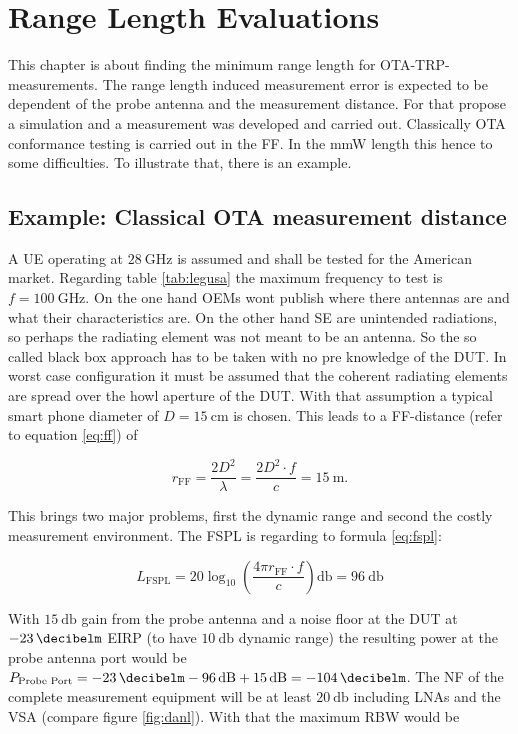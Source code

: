 \chapter{Range Length Evaluations}

This chapter is about finding the minimum range length for \ac{OTA}-\ac{TRP}-measurements. The range length induced measurement error is expected to be dependent of the probe antenna and the measurement distance. For that propose a simulation and a measurement was developed and carried out. Classically \ac{OTA} conformance testing is carried out in the \ac{FF}. In the \ac{mmW} length this hence to some difficulties. To illustrate that, there is an example.

\section{Example: Classical OTA measurement distance}

A \ac{UE} operating at $\SI{28}{\giga\hertz}$ is assumed and shall be tested for the American market. Regarding table \ref{tab:legusa} the maximum frequency to test is $f = \SI{100}{\giga\hertz}$. On the one hand \acp{OEM} wont publish where there antennas are and what their characteristics are. On the other hand \ac{SE} are unintended radiations, so perhaps the radiating element was not meant to be an antenna. So the so called black box approach has to be taken with no pre knowledge of the \ac{DUT}. In worst case configuration it must be assumed that the coherent radiating elements are spread over the howl aperture of the \ac{DUT}. With that assumption a typical smart phone diameter of $D=\SI{15}{\centi\meter}$ is chosen. This leads to a \ac{FF}-distance (refer to equation \ref{eq:ff}) of 

\begin{equation}
r_{\text{FF}} = \frac{2D^2}{\lambda} = \frac{2D^2\cdot f}{c} = \SI{15}{\meter}.
\end{equation}

This brings two major problems, first the dynamic range and second the costly measurement environment. The \ac{FSPL} is regarding to formula \ref{eq:fspl}:

\begin{equation}
L_{\text{FSPL}} = 20\log_{10}\left(\frac{4\pi r_{\text{FF}} \cdot f}{c}\right)\si{\decibel} = \SI{96}{\decibel}
\end{equation}

With $\SI{15}{\decibel}$ gain from the probe antenna and a noise floor at the \ac{DUT} at $\SI{-23}{\decibelm}$ \ac{EIRP} (to have $\SI{10}{\decibel}$ dynamic range) the resulting power at the probe antenna port would be $P_{\text{Probe Port}} = \SI{-23}{\decibelm}-\SI{96}{\decibel}+\SI{15}{\decibel}=\SI{-104}{\decibelm}$. The \ac{NF} of the complete measurement equipment will be at least $\SI{20}{\decibel}$ including \acp{LNA} and the \ac{VSA} (compare figure \ref{fig:danl}). With that the maximum \ac{RBW} would be 

